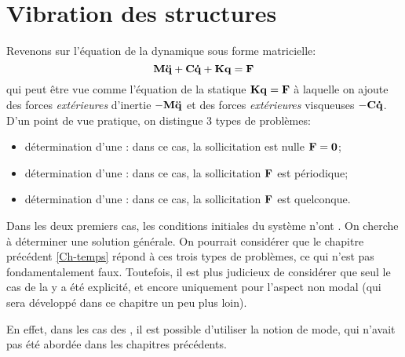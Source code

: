 \section{Vibration des structures}
Revenons sur l'équation de la dynamique sous forme matricielle:
\begin{equation} \MM{M}\VV{\ddot{q}}+\MM{C}\VV{\dot{q}}+\MM{K}\VV{q}=\VV{F} \end{equation}
qui peut être vue comme l'équation de la statique $\MM{K}\VV{q}=\VV{F}$ à laquelle on
ajoute des forces \emph{extérieures} d'inertie $-\MM{M}\VV{\ddot{q}}$ et des forces \emph{extérieures} visqueuses $-\MM{C}\VV{\dot{q}}$.
\medskipvm
D'un point de vue pratique, on distingue 3 types de problèmes:
\begin{itemize}
   \item détermination d'une :
	dans ce cas, la sollicitation est nulle $\VV{F} = \VV{0}$;
   \item détermination d'une :
 	dans ce cas, la sollicitation $\VV{F}$ est périodique;
   \item détermination d'une :
	dans ce cas, la sollicitation $\VV{F}$ est quelconque.
\end{itemize}
Dans les deux premiers cas, les conditions initiales du système n'ont .
On cherche à déterminer une solution générale.
\medskipvm
On pourrait considérer que le chapitre précédent \ref{Ch-temps} répond à ces trois
types de problèmes, ce qui n'est pas fondamentalement faux.
Toutefois, il est plus judicieux de considérer que seul le cas de la  
y a été explicité, et encore uniquement pour l'aspect non modal (qui sera développé dans ce chapitre
un peu plus loin).

En effet, dans les cas des  ,
il est possible d'utiliser la notion de mode, qui n'avait pas été abordée dans les chapitres précédents.


\medskip
